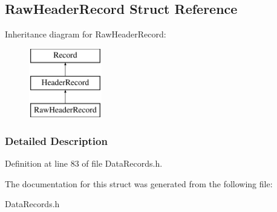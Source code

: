 \hypertarget{structRawHeaderRecord}{
\subsection{RawHeaderRecord Struct Reference}
\label{structRawHeaderRecord}
}
Inheritance diagram for RawHeaderRecord:\begin{figure}[H]
\begin{center}
\leavevmode
\includegraphics[height=3.000000cm]{structRawHeaderRecord}
\end{center}
\end{figure}


\subsubsection{Detailed Description}


Definition at line 83 of file DataRecords.h.



The documentation for this struct was generated from the following file:\begin{DoxyCompactItemize}
\item 
DataRecords.h\end{DoxyCompactItemize}
